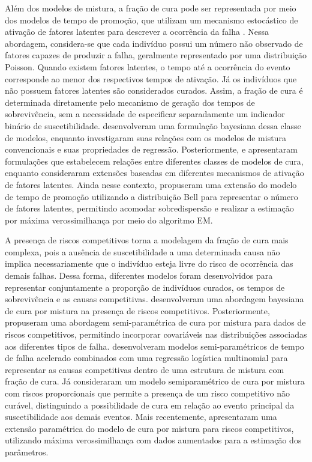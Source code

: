 \documentclass[11pt,a4paper]{article}
\begin{document}
Além dos modelos de mistura, a fração de cura pode ser representada por meio dos modelos de tempo de promoção, que utilizam um mecanismo estocástico de ativação de fatores latentes para descrever a ocorrência da falha \citep{Yakovlev1996}. Nessa abordagem, considera-se que cada indivíduo possui um número não observado de fatores capazes de produzir a falha, geralmente representado por uma distribuição Poisson. Quando existem fatores latentes, o tempo até a ocorrência do evento corresponde ao menor dos respectivos tempos de ativação. Já os indivíduos que não possuem fatores latentes são considerados curados. Assim, a fração de cura é determinada diretamente pelo mecanismo de geração dos tempos de sobrevivência, sem a necessidade de especificar separadamente um indicador binário de suscetibilidade. \cite{chen1999new} desenvolveram uma formulação bayesiana dessa classe de modelos, enquanto \cite{tsodikov2003estimating} investigaram suas relações com os modelos de mistura convencionais e suas propriedades de regressão. Posteriormente, \citet{yin2005cure} e \citet{rodrigues2009unification} apresentaram formulações que estabelecem relações entre diferentes classes de modelos de cura, enquanto \citet{cooner2007flexible} consideraram extensões baseadas em diferentes mecanismos de ativação de fatores latentes. Ainda nesse contexto, \citet{gallardo2021alternative} propuseram uma extensão do modelo de tempo de promoção utilizando a distribuição Bell para representar o número de fatores latentes, permitindo acomodar sobredispersão e realizar a estimação por máxima verossimilhança por meio do algoritmo EM.

A presença de riscos competitivos torna a modelagem da fração de cura mais complexa, pois a ausência de suscetibilidade a uma determinada causa não implica necessariamente que o indivíduo esteja livre do risco de ocorrência das demais falhas. Dessa forma, diferentes modelos foram desenvolvidos para representar conjuntamente a proporção de indivíduos curados, os tempos de sobrevivência e as causas competitivas.  \citet{basu2010breast} desenvolveram uma abordagem bayesiana de cura por mistura na presença de riscos competitivos. Posteriormente, \cite{choi2015efficient} propuseram uma abordagem semi-paramétrica de cura por mistura para dados de riscos competitivos, permitindo incorporar covariáveis nas distribuições associadas aos diferentes tipos de falha. \cite{choi2018semiparametric} desenvolveram modelos semi-paramétricos de tempo de falha acelerado combinados com uma regressão logística multinomial para representar as causas competitivas dentro de uma estrutura de mistura com fração de cura. Já \citet{wang2021semiparametric} consideraram um modelo semiparamétrico de cura por mistura com riscos proporcionais que permite a presença de um risco competitivo não curável, distinguindo a possibilidade de cura em relação ao evento principal da suscetibilidade aos demais eventos. Mais recentemente, \cite{debrito2026parametricmixturecurerate} apresentaram uma extensão paramétrica do modelo de cura por mistura para riscos competitivos, utilizando máxima verossimilhança com dados aumentados para a estimação dos parâmetros.
\end{document}
